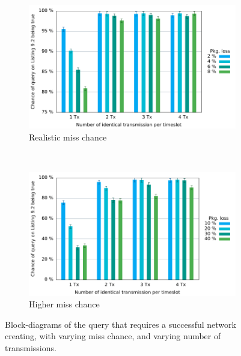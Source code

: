\begin{figure}[p]
\begin{subfigure}{\linewidth}
\centering
\includegraphics{Figures/Graphs/gnuplot/ccucChance/graph2.pdf} 
\caption{Realistic miss chance}
\label{CCUC-Graph-UPPAAL}
\end{subfigure}\\
\begin{subfigure}{\linewidth}
\centering
\includegraphics{Figures/Graphs/gnuplot/ccucChance/graph3.pdf} 
\caption{Higher miss chance}
\label{fig:crazy_graph}
\end{subfigure}
\caption{Block-diagrams of the query that requires a successful network creating, with varying miss chance, and varying number of transmissions.}
\end{figure} 


